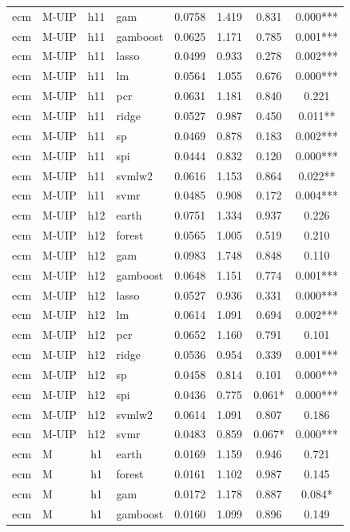 \begin{ThreePartTable}
\begin{longtable}[t]{llclcccc}
ecm & M-UIP & h11 & gam & 0.0758 & 1.419 & 0.831 & 0.000***\\
ecm & M-UIP & h11 & gamboost & 0.0625 & 1.171 & 0.785 & 0.001***\\
ecm & M-UIP & h11 & lasso & 0.0499 & 0.933 & 0.278 & 0.002***\\
ecm & M-UIP & h11 & lm & 0.0564 & 1.055 & 0.676 & 0.000***\\
ecm & M-UIP & h11 & pcr & 0.0631 & 1.181 & 0.840 & 0.221\\
ecm & M-UIP & h11 & ridge & 0.0527 & 0.987 & 0.450 & 0.011**\\
ecm & M-UIP & h11 & sp & 0.0469 & 0.878 & 0.183 & 0.002***\\
ecm & M-UIP & h11 & spi & 0.0444 & 0.832 & 0.120 & 0.000***\\
ecm & M-UIP & h11 & svmlw2 & 0.0616 & 1.153 & 0.864 & 0.022**\\
ecm & M-UIP & h11 & svmr & 0.0485 & 0.908 & 0.172 & 0.004***\\
\addlinespace
ecm & M-UIP & h12 & earth & 0.0751 & 1.334 & 0.937 & 0.226\\
ecm & M-UIP & h12 & forest & 0.0565 & 1.005 & 0.519 & 0.210\\
ecm & M-UIP & h12 & gam & 0.0983 & 1.748 & 0.848 & 0.110\\
ecm & M-UIP & h12 & gamboost & 0.0648 & 1.151 & 0.774 & 0.001***\\
ecm & M-UIP & h12 & lasso & 0.0527 & 0.936 & 0.331 & 0.000***\\
ecm & M-UIP & h12 & lm & 0.0614 & 1.091 & 0.694 & 0.002***\\
ecm & M-UIP & h12 & pcr & 0.0652 & 1.160 & 0.791 & 0.101\\
ecm & M-UIP & h12 & ridge & 0.0536 & 0.954 & 0.339 & 0.001***\\
ecm & M-UIP & h12 & sp & 0.0458 & 0.814 & 0.101 & 0.000***\\
ecm & M-UIP & h12 & spi & 0.0436 & 0.775 & 0.061* & 0.000***\\
ecm & M-UIP & h12 & svmlw2 & 0.0614 & 1.091 & 0.807 & 0.186\\
ecm & M-UIP & h12 & svmr & 0.0483 & 0.859 & 0.067* & 0.000***\\
\addlinespace
ecm & M & h1 & earth & 0.0169 & 1.159 & 0.946 & 0.721\\
ecm & M & h1 & forest & 0.0161 & 1.102 & 0.987 & 0.145\\
ecm & M & h1 & gam & 0.0172 & 1.178 & 0.887 & 0.084*\\
ecm & M & h1 & gamboost & 0.0160 & 1.099 & 0.896 & 0.149\\

\end{longtable}
\end{ThreePartTable}
